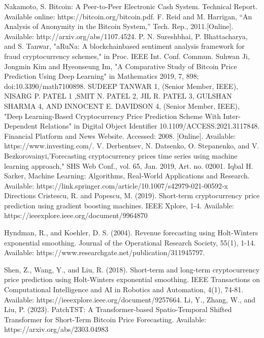 \documentclass[conference]{IEEEtran}
\begin{document}
\begin{thebibliography}{00}
 Nakamoto, S. Bitcoin: A Peer-to-Peer Electronic Cash System. Technical Report. Available online: https://bitcoin.org/bitcoin.pdf.
 F. Reid and M. Harrigan, “An Analysis of Anonymity in the Bitcoin System,” Tech. Rep., 2011.[Online]. Available: http://arxiv.org/abs/1107.4524.
 P. N. Sureshbhai, P. Bhattacharya, and S. Tanwar, "aRuNa: A blockchainbased sentiment analysis framework for fraud cryptocurrency schemes," in Proc. IEEE Int. Conf. Commun. 
 Suhwan Ji, Jongmin Kim and Hyeonseung Im, "A Comparative Study of Bitcoin Price Prediction Using Deep Learning" in Mathematics 2019, 7, 898; doi:10.3390/math7100898.
 SUDEEP TANWAR 1, (Senior Member, IEEE), NISARG P. PATEL 1
,SMIT N. PATEL 2, JIL R. PATEL 3, GULSHAN SHARMA 4, AND INNOCENT E. DAVIDSON 4, (Senior Member, IEEE), "Deep Learning-Based Cryptocurrency
Price Prediction Scheme With Inter-Dependent Relations" in Digital Object Identifier 10.1109/ACCESS.2021.3117848.
 Financial Platform and News Website. Accessed: 2008. [Online]. Available: https://www.investing.com/.
 V. Derbentsev, N. Datsenko, O. Stepanenko, and V. Bezkorovainyi,'Forecasting cryptocurrency prices time series using machine learning approach," SHS Web Conf., vol. 65, Jan. 2019, Art. no. 02001.
 Iqbal H. Sarker, Machine Learning: Algorithms, Real‑World Applications and Research. Available: https://link.springer.com/article/10.1007/s42979-021-00592-x
Directions
 Cristescu, R. and Popescu, M. (2019). Short-term cryptocurrency price prediction using gradient boosting machines. IEEE Xplore, 1-4. Available: https://ieeexplore.ieee.org/document/9964870

 Hyndman, R., and Koehler, D. S. (2004). Revenue forecasting using Holt-Winters exponential smoothing. Journal of the Operational Research Society, 55(1), 1-14. Available: https://www.researchgate.net/publication/311945797.

 Shen, Z., Wang, Y., and Liu, R. (2018). Short-term and long-term cryptocurrency price prediction using Holt-Winters exponential smoothing. IEEE Transactions on Computational Intelligence and AI in Robotics and Automation, 4(1), 74-81. Available: https://ieeexplore.ieee.org/document/9257664.
 Li, Y., Zhang, W., and Liu, P. (2023). PatchTST: A Transformer-based Spatio-Temporal Shifted Transformer for Short-Term Bitcoin Price Forecasting. Available: https://arxiv.org/abs/2303.04983

\end{thebibliography}
\vspace{12pt}
\end{document}

